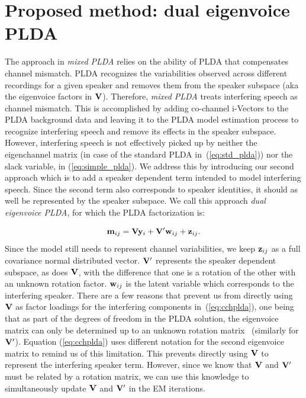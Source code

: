 \section{Proposed method: dual eigenvoice PLDA}
\label{sec:dualev_plda}

The approach in {\it mixed PLDA} relies on the ability of PLDA that compensates channel mismatch. 
PLDA recognizes the variabilities observed across different recordings for a given speaker and removes them from the speaker subspace (aka the eigenvoice factors in ${\bf V}$). 
Therefore, {\it mixed PLDA} treats interfering speech as channel mismatch. 
This is accomplished by adding co-channel i-Vectors to the PLDA background data and leaving it to the PLDA model estimation process to recognize interfering speech and remove its effects in the speaker subspace. 
However, interfering speech is not effectively picked up by neither the eigenchannel matrix (in case of the standard PLDA in~(\ref{eq:std_plda})) nor the slack variable, in (\ref{eq:simple_plda}). 
We address this by introducing our second approach which is to add a speaker dependent term intended to model interfering speech. Since the second term also corresponds to speaker identities, it should as well be represented by the speaker subspace. 
We call this approach {\it dual eigenvoice PLDA}, for which the PLDA factorization is: 

\begin{equation}
\label{eq:cchplda}
{\bf m}_{ij} = {\bf V}{\bf y}_i+{\bf V}^\prime {\bf w}_{ij}+{\bf z}_{ij}.
\end{equation}
Since the model still needs to represent channel variabilities, we keep ${\bf z}_{ij}$ as a full covariance normal distributed vector. 
${\bf V}^\prime$ represents the speaker dependent subspace, as does ${\bf V}$, with the difference that one is a rotation of the other with an unknown rotation factor. 
${\bf w}_{ij}$ is the latent variable which corresponds to the interfering speaker. 
There are a few reasons that prevent us from directly using ${\bf V}$ as factor loadings for the interfering components in~(\ref{eq:cchplda}), one being that as part of the degrees of freedom in the PLDA solution, the eigenvoice matrix can only be determined up to an unknown rotation matrix~\cite{sizov2014unifying} (similarly for ${\bf V}^\prime$). 
Equation (\ref{eq:cchplda}) uses different notation for the second eigenvoice matrix to remind us of this limitation. 
This prevents directly using ${\bf V}$ to represent the interfering speaker term. However, since we know that ${\bf V}$ and ${\bf V}^\prime$ must be related by a rotation matrix, we can use this knowledge to simultaneously update ${\bf V}$ and ${\bf V}^\prime$ in the EM iterations. 


